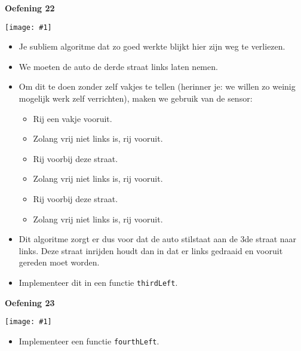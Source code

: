 \documentclass[a4paper]{article}
\newcommand{\newexercise}[1]{\clearpage\begin{center}\Huge\bf #1\end{center}}
\newcommand{\exercisemap}[1]{\begin{center}\texttt{[image: \#1]}\end{center}}
\begin{document}
\newexercise{Oefening 22}
\exercisemap{ex22}
\begin{itemize}
  \item Je subliem algoritme dat zo goed werkte blijkt hier zijn weg te verliezen.
  \item We moeten de auto de derde straat links laten nemen.
  \item Om dit te doen zonder zelf vakjes te tellen (herinner je: we willen
        zo weinig mogelijk werk zelf verrichten), maken we gebruik van de sensor:
        \begin{itemize}
          \item Rij een vakje vooruit.
          \item Zolang vrij niet links is, rij vooruit.
          \item Rij voorbij deze straat.
          \item Zolang vrij niet links is, rij vooruit.
          \item Rij voorbij deze straat.
          \item Zolang vrij niet links is, rij vooruit.
        \end{itemize}
  \item Dit algoritme zorgt er dus voor dat de auto
        stilstaat aan de 3de straat naar links.
        Deze straat inrijden houdt dan in dat er links gedraaid en vooruit gereden moet worden.
  \item Implementeer dit in een functie \verb'thirdLeft'.
\end{itemize}

\newexercise{Oefening 23}
\exercisemap{ex23}
\begin{itemize}
  \item Implementeer een functie \verb'fourthLeft'.
\end{itemize}
\end{document}
